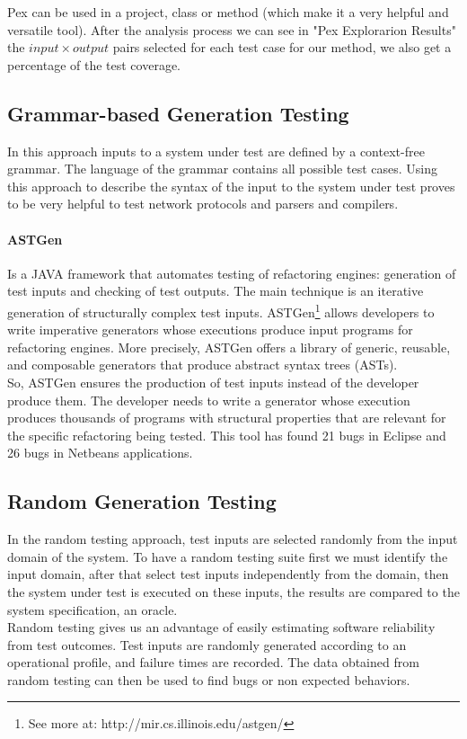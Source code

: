 \documentclass[citeauthoryear]{llncs}
\begin{document}
Pex can be used in a project, class or method (which make it a very helpful and versatile tool). After the analysis process we can see in "Pex Explorarion Results"
the $input \times output$ pairs selected for each test case for our method, we also get a percentage of the test coverage.

\subsection{Grammar-based Generation Testing}
In this approach inputs to a system under test are defined by a context-free grammar. The language of the grammar contains all possible test cases.
Using this approach to describe the syntax of the input to the system under test proves to be very helpful to test
network protocols\cite{tal:syntax-based,kaksonen2001functional} and parsers and compilers\cite{1994-burgess,Burgess_Saidi_1996}.

\paragraph{\textbf{ASTGen}\cite{Daniel:2007:ATR:1287624.1287651}} Is a JAVA framework that automates testing of refactoring engines: generation of test inputs
and checking of test outputs. The main technique is an iterative generation of structurally complex test inputs.
ASTGen\footnote{See more at: http://mir.cs.illinois.edu/astgen/} allows developers to write imperative generators whose executions
produce input programs for refactoring engines. More precisely, ASTGen
offers a library of generic, reusable, and composable generators that produce abstract syntax trees (ASTs).\\
So, ASTGen ensures the production of test inputs instead of the developer produce them. The developer needs to write a generator whose execution
produces thousands of programs with structural properties that are relevant for the specific refactoring being tested. This tool has found
21 bugs in Eclipse and 26 bugs in Netbeans applications.

\subsection{Random Generation Testing}
In the random testing approach, test inputs are selected randomly from the input domain of the system.
To have a random testing suite first we must identify the input domain, after that select test inputs independently from the domain,
then the system under test is executed on these inputs, the results are compared to the system specification, an oracle.\\
Random testing gives us an advantage of easily estimating software reliability from test outcomes.
Test inputs are randomly generated according to an operational profile, and failure times are recorded.
The data obtained from random testing can then be used to find bugs or non expected behaviors.\\
\end{document}
